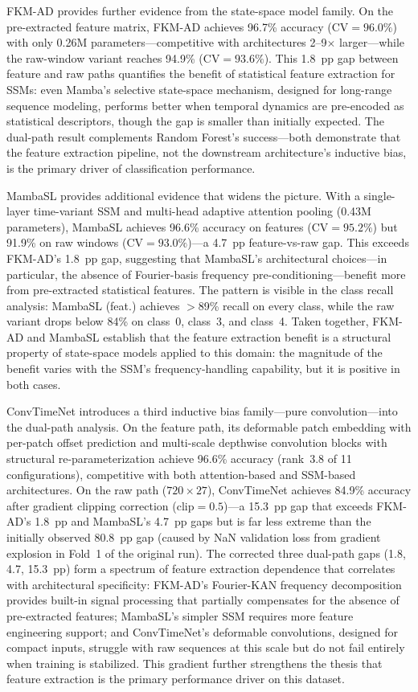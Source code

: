 \documentclass[conference]{IEEEtran}
\begin{document}
FKM-AD provides further evidence from the state-space model family. On the pre-extracted feature matrix, FKM-AD achieves 96.7\% accuracy (CV${=}96.0\%$) with only 0.26M parameters---competitive with architectures 2--9$\times$ larger---while the raw-window variant reaches 94.9\% (CV${=}93.6\%$). This 1.8~pp gap between feature and raw paths quantifies the benefit of statistical feature extraction for SSMs: even Mamba's selective state-space mechanism, designed for long-range sequence modeling, performs better when temporal dynamics are pre-encoded as statistical descriptors, though the gap is smaller than initially expected. The dual-path result complements Random Forest's success---both demonstrate that the feature extraction pipeline, not the downstream architecture's inductive bias, is the primary driver of classification performance.

MambaSL \cite{mambasl} provides additional evidence that widens the picture. With a single-layer time-variant SSM and multi-head adaptive attention pooling (0.43M parameters), MambaSL achieves 96.6\% accuracy on features (CV${=}95.2\%$) but 91.9\% on raw windows (CV${=}93.0\%$)---a 4.7~pp feature-vs-raw gap. This exceeds FKM-AD's 1.8~pp gap, suggesting that MambaSL's architectural choices---in particular, the absence of Fourier-basis frequency pre-conditioning---benefit more from pre-extracted statistical features. The pattern is visible in the class recall analysis: MambaSL (feat.) achieves $>$89\% recall on every class, while the raw variant drops below 84\% on class~0, class~3, and class~4. Taken together, FKM-AD and MambaSL establish that the feature extraction benefit is a structural property of state-space models applied to this domain: the magnitude of the benefit varies with the SSM's frequency-handling capability, but it is positive in both cases.

ConvTimeNet \cite{convtimenet} introduces a third inductive bias family---pure convolution---into the dual-path analysis. On the feature path, its deformable patch embedding with per-patch offset prediction and multi-scale depthwise convolution blocks with structural re-parameterization achieve 96.6\% accuracy (rank~3.8 of 11 configurations), competitive with both attention-based and SSM-based architectures. On the raw path ($720 \times 27$), ConvTimeNet achieves 84.9\% accuracy after gradient clipping correction ($\text{clip}{=}0.5$)---a 15.3~pp gap that exceeds FKM-AD's 1.8~pp and MambaSL's 4.7~pp gaps but is far less extreme than the initially observed 80.8~pp gap (caused by NaN validation loss from gradient explosion in Fold~1 of the original run). The corrected three dual-path gaps (1.8, 4.7, 15.3~pp) form a spectrum of feature extraction dependence that correlates with architectural specificity: FKM-AD's Fourier-KAN frequency decomposition provides built-in signal processing that partially compensates for the absence of pre-extracted features; MambaSL's simpler SSM requires more feature engineering support; and ConvTimeNet's deformable convolutions, designed for compact inputs, struggle with raw sequences at this scale but do not fail entirely when training is stabilized. This gradient further strengthens the thesis that feature extraction is the primary performance driver on this dataset.
\end{document}

